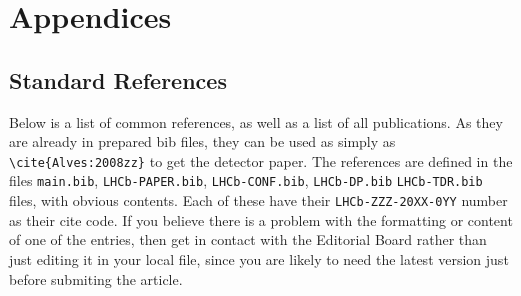 
\clearpage
\appendix

\chapter{Appendices}

\section{Standard References}
\label{sec:StandardReferences}
Below is a list of common references, as
well as a list of all \lhcb publications. 
As they are already in prepared bib files, they can be used as simply as
\texttt{\textbackslash cite\{Alves:2008zz\}} to get the \lhcb detector paper. 
The references are defined in the files \texttt{main.bib},  \texttt{LHCb-PAPER.bib},
\texttt{LHCb-CONF.bib}, \texttt{LHCb-DP.bib} \texttt{LHCb-TDR.bib} files, with obvious contents.
Each of these have their \texttt{LHCb-ZZZ-20XX-0YY} number as their cite code.
If you believe there is a problem with the formatting or
content of one of the entries, then get in contact with the Editorial
Board rather than just editing it in your local file,
since you are likely to need the latest version just before submiting the article.

